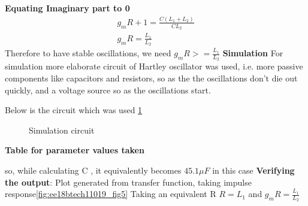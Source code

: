 \begin{enumerate}[label=\arabic*.,ref=\theenumi]
\textbf{Equating Imaginary part to 0}\newline
\begin{align}
    g_mR + 1 = \frac{C(L_1 +L_2)}{CL_2}\\
    g_mR = \frac{L_1}{L_2}
\end{align}
Therefore to have stable oscillations, we need \newline
$g_mR >= \frac{L_1}{L_2}$\newline\newline
\textbf{Simulation}\newline
For simulation more elaborate circuit of Hartley oscillator was used, i.e. more passive components like capacitors and resistors, so as the the oscillations don't die out quickly, and a voltage source so as the oscillations start.\newline

Below is the circuit which was used \ref{fig:ee18btech11019_fig4}
\begin{figure}[!ht]
	\begin{center}
		\resizebox{\columnwidth}{!}{}
	\end{center}
\caption{Simulation circuit}
\label{fig:ee18btech11019_fig4}
\end{figure}


\textbf{Table for parameter values taken}
\begin{table}[!ht]
\centering

\caption{}
\label{table:ee18btech11019_1}
\end{table}
so, while calculating C , it equivalently becomes $45.1\mu F$ in this case\newline
\textbf{Verifying the output}:\newline
Plot generated from transfer function, taking impulse response\newline \ref{fig:ee18btech11019_fig5}
Taking an equivalent R  \newline
$R = L_1$ and $g_mR = \frac{L_1}{L_2}$\newline


\end{enumerate}
